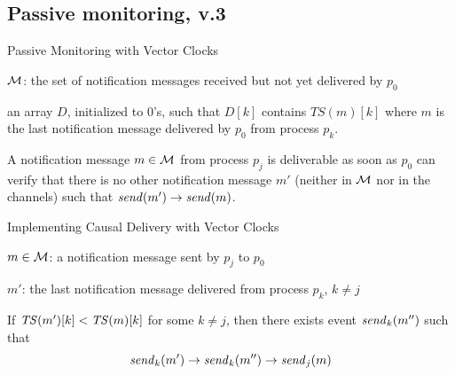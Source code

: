 % 
% 
% 
%  
% 

\subsection{Passive monitoring, v.3}





\begin{frame}{Passive Monitoring with Vector Clocks}
	

\BI
\item $\cal M$: the set of notification messages received but not yet delivered by $p_0$
\item an array $D$, initialized to 0's, such that $D[k]$ contains $TS(m)[k]$ where $m$
  is the last notification message delivered by $p_0$ from process $p_k$.
\EI

\bigskip
{}

A notification message $m \in \cal M$ from process $p_j$ is deliverable as soon as $p_0$
can verify that there is no other notification message $m'$ (neither in $\cal M$ nor in the 
channels) such that $\mathit{send}(m') \rightarrow \mathit{send}(m)$.

\end{frame}


\begin{frame}{Implementing Causal Delivery with Vector Clocks}

\BI
\item $m \in \cal M$: a notification message sent by $p_j$ to $p_0$
\item $m'$: the last notification message delivered from process $p_k$, $k \neq j$
\EI

\bigskip
\begin{definition}
If $\mathit{TS}(m')[k] < \mathit{TS}(m)[k]$ for some $k \neq j$, then there exists event $\mathit{send}_k(m'')$ such that
\[
  \mathit{send}_k(m') \rightarrow \mathit{send}_k(m'') \rightarrow \mathit{send}_j(m)
\]
\end{definition}

\bigskip
\end{frame}


